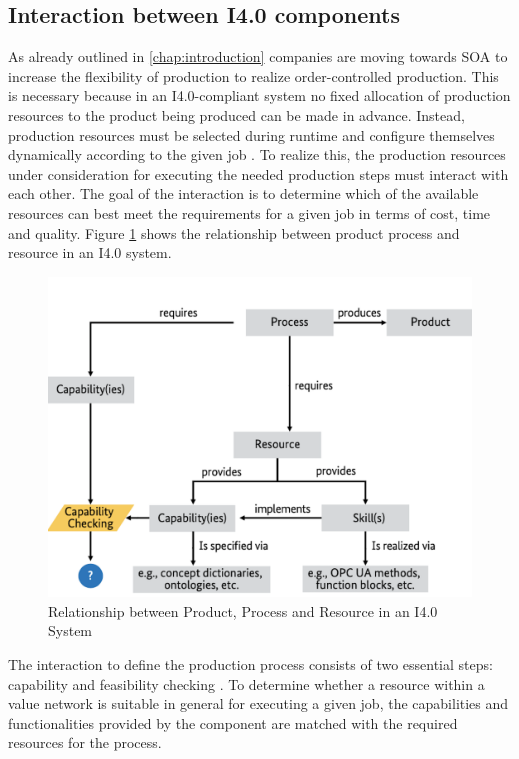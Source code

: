 \subsection{Interaction between I4.0 components}
As already outlined in \ref{chap:introduction} companies are moving towards \ac{SOA} to increase the flexibility of production to realize order-controlled production. This is necessary because in an \ac{I4.0}-compliant system no fixed allocation of production resources to the product being produced can be made in advance. Instead, production resources must be selected during runtime and configure themselves dynamically according to the given job \cite[p. 6]{Bock2016Weiterentwicklung4.0-Komponenten}. To realize this, the production resources under consideration for executing the needed production steps must interact with each other. The goal of the interaction is to determine which of the available resources can best meet the requirements for a given job in terms of cost, time and quality. Figure \ref{fig:relationshipppr} shows the relationship between product process and resource in an \ac{I4.0} system.

\begin{figure}[h]
\centering
\includegraphics[scale=0.5]{content/pictures/relationship_product_process_resource.png}
\caption{Relationship between Product, Process and Resource in an I4.0 System}
\label{fig:relationshipppr}
\end{figure}

The interaction to define the production process consists of two essential steps: capability and feasibility checking \cite[p. 6]{Bayha2020DescribingComponents}. To determine whether a resource within a value network is suitable in general for executing a given job, the capabilities and functionalities provided by the component are matched with the required resources for the process.

